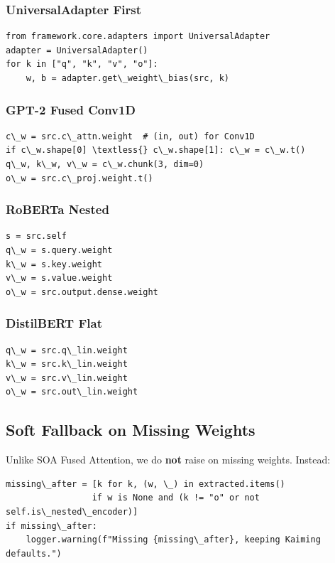 \subsubsection{UniversalAdapter First}

\begin{lstlisting}
from framework.core.adapters import UniversalAdapter
adapter = UniversalAdapter()
for k in ["q", "k", "v", "o"]:
    w, b = adapter.get\_weight\_bias(src, k)
\end{lstlisting}

\subsubsection{GPT-2 Fused Conv1D}

\begin{lstlisting}
c\_w = src.c\_attn.weight  # (in, out) for Conv1D
if c\_w.shape[0] \textless{} c\_w.shape[1]: c\_w = c\_w.t()
q\_w, k\_w, v\_w = c\_w.chunk(3, dim=0)
o\_w = src.c\_proj.weight.t()
\end{lstlisting}

\subsubsection{RoBERTa Nested}

\begin{lstlisting}
s = src.self
q\_w = s.query.weight
k\_w = s.key.weight
v\_w = s.value.weight
o\_w = src.output.dense.weight
\end{lstlisting}

\subsubsection{DistilBERT Flat}

\begin{lstlisting}
q\_w = src.q\_lin.weight
k\_w = src.k\_lin.weight
v\_w = src.v\_lin.weight
o\_w = src.out\_lin.weight
\end{lstlisting}

\subsection{Soft Fallback on Missing Weights}

Unlike SOA Fused Attention, we do \textbf{not} raise on missing weights. Instead:

\begin{lstlisting}
missing\_after = [k for k, (w, \_) in extracted.items() 
                 if w is None and (k != "o" or not self.is\_nested\_encoder)]
if missing\_after:
    logger.warning(f"Missing {missing\_after}, keeping Kaiming defaults.")
\end{lstlisting}

